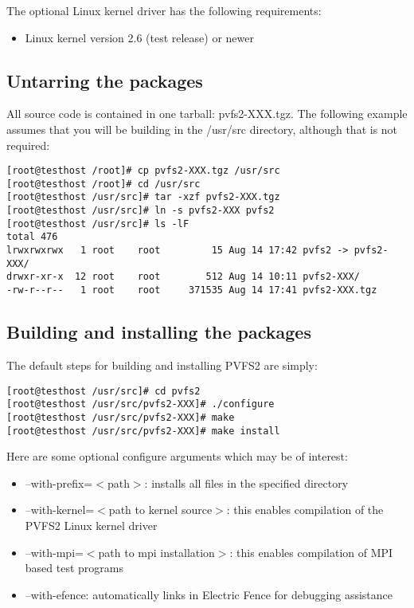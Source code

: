 \documentclass[11pt, letterpaper]{article}
\begin{document}
The optional Linux kernel driver has the following requirements:
\begin{itemize}
\item Linux kernel version 2.6 (test release) or newer
\end{itemize}

\subsection{Untarring the packages}

All source code is contained in one tarball: pvfs2-XXX.tgz.  The following example assumes that you will be building in the /usr/src directory, although that is not required:

\begin{verbatim}
[root@testhost /root]# cp pvfs2-XXX.tgz /usr/src
[root@testhost /root]# cd /usr/src
[root@testhost /usr/src]# tar -xzf pvfs2-XXX.tgz
[root@testhost /usr/src]# ln -s pvfs2-XXX pvfs2
[root@testhost /usr/src]# ls -lF
total 476
lrwxrwxrwx   1 root    root         15 Aug 14 17:42 pvfs2 -> pvfs2-XXX/
drwxr-xr-x  12 root    root        512 Aug 14 10:11 pvfs2-XXX/
-rw-r--r--   1 root    root     371535 Aug 14 17:41 pvfs2-XXX.tgz

\end{verbatim}

\subsection{Building and installing the packages}

The default steps for building and installing PVFS2 are simply:

\begin{verbatim}
[root@testhost /usr/src]# cd pvfs2
[root@testhost /usr/src/pvfs2-XXX]# ./configure
[root@testhost /usr/src/pvfs2-XXX]# make
[root@testhost /usr/src/pvfs2-XXX]# make install
\end{verbatim}

Here are some optional configure arguments which may be of interest:
\begin{itemize}
\item --with-prefix=$<$path$>$: installs all files in the specified directory
\item --with-kernel=$<$path to kernel source$>$: this enables compilation of
the PVFS2 Linux kernel driver
\item --with-mpi=$<$path to mpi installation$>$: this enables compilation of MPI
based test programs
\item --with-efence: automatically links in Electric Fence for debugging assistance
\end{itemize}
\end{document}
